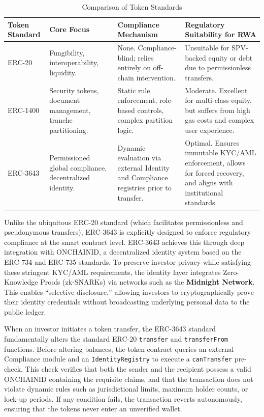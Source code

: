 \documentclass{Resources/bdlt-project}
\begin{document}
\begin{table}[htbp]
\centering
\renewcommand{\arraystretch}{1.5}
\begin{tabularx}{\textwidth}{lXXX}
\toprule
\textbf{Token Standard} & \textbf{Core Focus} & \textbf{Compliance Mechanism} & \textbf{Regulatory Suitability for RWA} \\
\midrule
ERC-20 & Fungibility, interoperability, liquidity. & None. Compliance-blind; relies entirely on off-chain intervention. & Unsuitable for SPV-backed equity or debt due to permissionless transfers. \\
ERC-1400 & Security tokens, document management, tranche partitioning. & Static rule enforcement, role-based controls, complex partition logic. & Moderate. Excellent for multi-class equity, but suffers from high gas costs and complex user experience. \\
ERC-3643 & Permissioned global compliance, decentralized identity. & Dynamic evaluation via external Identity and Compliance registries prior to transfer. & Optimal. Ensures immutable KYC/AML enforcement, allows for forced recovery, and aligns with institutional standards. \\
\bottomrule
\end{tabularx}
\caption{Comparison of Token Standards}
\end{table}

Unlike the ubiquitous ERC-20 standard (which facilitates permissionless and pseudonymous transfers), ERC-3643 is explicitly designed to enforce regulatory compliance at the smart contract level. ERC-3643 achieves this through deep integration with ONCHAINID, a decentralized identity system based on the ERC-734 and ERC-735 standards. To preserve investor privacy while satisfying these stringent KYC/AML requirements, the identity layer integrates Zero-Knowledge Proofs (zk-SNARKs) via networks such as the \textbf{Midnight Network}. This enables ``selective disclosure,'' allowing investors to cryptographically prove their identity credentials without broadcasting underlying personal data to the public ledger.

When an investor initiates a token transfer, the ERC-3643 standard fundamentally alters the standard ERC-20 \texttt{transfer} and \texttt{transferFrom} functions. Before altering balances, the token contract queries an external Compliance module and an \texttt{IdentityRegistry} to execute a \texttt{canTransfer} pre-check. This check verifies that both the sender and the recipient possess a valid ONCHAINID containing the requisite claims, and that the transaction does not violate dynamic rules such as jurisdictional limits, maximum holder counts, or lock-up periods. If any condition fails, the transaction reverts autonomously, ensuring that the tokens never enter an unverified wallet.
\end{document}

